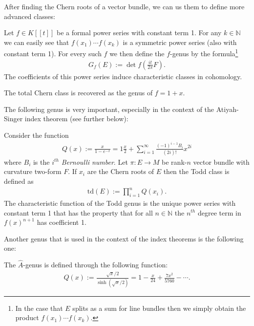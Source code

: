     After finding the Chern roots of a vector bundle, we can us them to define more advanced classes:
    \begin{construct}[Genus]
        Let $f\in K[[t]]$ be a formal power series with constant term 1. For any $k\in\mathbb{N}$ we can easily see that $f(x_1)\cdots f(x_k)$ is a symmetric power series (also with constant term 1). For every such $f$ we then define the $f$-genus by the formula\footnote{In the case that $E$ splits as a sum for line bundles then we simply obtain the product $f(x_1)\cdots f(x_k)$.}
        \begin{gather}
            G_f(E) := \det f\left(\frac{it}{2\pi}F\right).
        \end{gather}
        The coefficients of this power series induce characteristic classes in cohomology.
    \end{construct}

    \begin{example}
        The total Chern class is recovered as the genus of $f=1+x$.
    \end{example}

    The following genus is very important, especially in the context of the Atiyah-Singer index theorem (see further below):
    \begin{example}
        Consider the function
        \begin{gather}
            Q(x) := \frac{x}{1-e^{-x}} = 1 \frac{x}{2} + \sum_{i=1}^\infty\frac{(-1)^{i-1}B_i}{(2i)!}x^{2i}
        \end{gather}
        where $B_i$ is the $i^{th}$ \textit{Bernoulli number}. Let $\pi:E\rightarrow M$ be rank-$n$ vector bundle with curvature two-form $F$. If $x_i$ are the Chern roots of $E$ then the Todd class is defined as
        \begin{gather}
            \text{td}(E) := \prod_{i=1}^nQ(x_i).
        \end{gather}
        The characteristic function of the Todd genus is the unique power series with constant term 1 that has the property that for all $n\in\mathbb{N}$ the $n^{th}$ degree term in $f(x)^{n+1}$ has coefficient 1.
    \end{example}
    Another genus that is used in the context of the index theorems is the following one:
    \begin{example}\label{diff:prin:a_roof_genus}
        The $\hat{A}$-genus is defined through the following function:
        \begin{gather}
            Q(x) := \frac{\sqrt{x}/2}{\sinh(\sqrt{x}/2)} = 1 - \frac{x}{24} + \frac{7x^2}{5760} - \cdots.
        \end{gather}
    \end{example}

